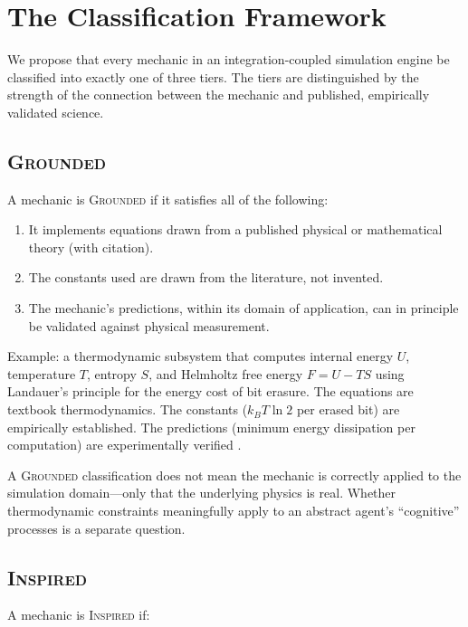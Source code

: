 \documentclass[12pt,a4paper]{article}
\begin{document}
\section{The Classification Framework}
\label{sec:framework}

We propose that every mechanic in an integration-coupled
simulation engine be classified into exactly one of three tiers.
The tiers are distinguished by the strength of the connection
between the mechanic and published, empirically validated
science.

\subsection{\textsc{Grounded}}

A mechanic is \textsc{Grounded} if it satisfies all of the
following:

\begin{enumerate}
  \item It implements equations drawn from a published physical
    or mathematical theory (with citation).
  \item The constants used are drawn from the literature, not
    invented.
  \item The mechanic's predictions, within its domain of
    application, can in principle be validated against physical
    measurement.
\end{enumerate}

Example: a thermodynamic subsystem that computes internal energy
$U$, temperature $T$, entropy $S$, and Helmholtz free energy
$F = U - TS$ using Landauer's principle \citep{landauer1961} for
the energy cost of bit erasure.  The equations are textbook
thermodynamics.  The constants ($k_B T \ln 2$ per erased bit)
are empirically established.  The predictions (minimum energy
dissipation per computation) are experimentally verified
\citep{berut2012}.

A \textsc{Grounded} classification does not mean the mechanic
is correctly applied to the simulation domain---only that the
underlying physics is real.  Whether thermodynamic constraints
meaningfully apply to an abstract agent's ``cognitive''
processes is a separate question.

\subsection{\textsc{Inspired}}

A mechanic is \textsc{Inspired} if:
\end{document}
